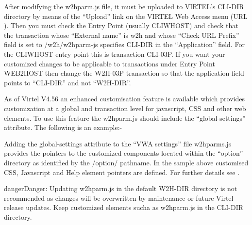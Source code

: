 \documentclass[letterpaper,10pt,english]{sphinxmanual}
\begin{document}
After modifying the w2hparm.js file, it must be uploaded to VIRTEL’s CLI-DIR directory by means of the “Upload” link on the VIRTEL Web Access menu (URL ). Then you must check the Entry Point (usually CLIWHOST) and check that the transaction whose “External name” is w2h and whose “Check URL Prefix” field is set to /w2h/w2hparm-js specifies CLI-DIR in the “Application” field. For the CLIWHOST entry point this is transaction CLI-03P. If you want your customized changes to be applicable to transactions under Entry Point WEB2HOST then change the W2H-03P transaction so that the application field points to “CLI-DIR” and not “W2H-DIR”.

As of Virtel V4.56 an enhanced customisation feature is available which provides customization at a global and transaction level for javascript, CSS and other web elements. To use this feature the w2hparm.js should include the “global-settings” attribute. The following is an example:-

\begin{sphinxVerbatim}[commandchars=\\\{\}]
 
 
\end{sphinxVerbatim}

Adding the global-settings attribute to the “VWA settings” file w2hparms.js provides the pointers to the customized components located within the “option” directory as identified by the /option/ pathname. In the sample above customised CSS, Javascript and Help element pointers are defined. For further details see {\hyperref[\detokenize{User_Guide:v457ug-customizing-with-option}]{}}.

\begin{sphinxadmonition}{danger}{Danger:}
Updating w2hparm.js in the default W2H-DIR directory is not recommended as changes will be overwritten by maintenance or future Virtel release updates. Keep customized elements sucha as w2hparm.js in the CLI-DIR directory.
\end{sphinxadmonition}
\end{document}
